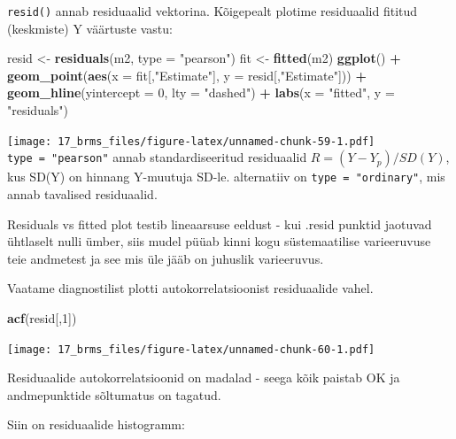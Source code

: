 \documentclass[]{book}
\newenvironment{Shaded}{\begin{snugshade}}{\end{snugshade}}
\newcommand{\KeywordTok}[1]{\textcolor[rgb]{0.13,0.29,0.53}{\textbf{#1}}}
\newcommand{\DataTypeTok}[1]{\textcolor[rgb]{0.13,0.29,0.53}{#1}}
\newcommand{\DecValTok}[1]{\textcolor[rgb]{0.00,0.00,0.81}{#1}}
\newcommand{\StringTok}[1]{\textcolor[rgb]{0.31,0.60,0.02}{#1}}
\newcommand{\OperatorTok}[1]{\textcolor[rgb]{0.81,0.36,0.00}{\textbf{#1}}}
\newcommand{\NormalTok}[1]{#1}
\begin{document}
\texttt{resid()} annab residuaalid vektorina. Kõigepealt plotime
residuaalid fititud (keskmiste) Y väärtuste vastu:

\begin{Shaded}
\begin{Highlighting}[]
\NormalTok{resid <-}\StringTok{ }\KeywordTok{residuals}\NormalTok{(m2, }\DataTypeTok{type =} \StringTok{"pearson"}\NormalTok{)}
\NormalTok{fit <-}\StringTok{ }\KeywordTok{fitted}\NormalTok{(m2)}
\KeywordTok{ggplot}\NormalTok{() }\OperatorTok{+}\StringTok{ }
\StringTok{  }\KeywordTok{geom_point}\NormalTok{(}\KeywordTok{aes}\NormalTok{(}\DataTypeTok{x =}\NormalTok{ fit[,}\StringTok{"Estimate"}\NormalTok{], }\DataTypeTok{y =}\NormalTok{ resid[,}\StringTok{"Estimate"}\NormalTok{])) }\OperatorTok{+}\StringTok{ }
\StringTok{  }\KeywordTok{geom_hline}\NormalTok{(}\DataTypeTok{yintercept =} \DecValTok{0}\NormalTok{, }\DataTypeTok{lty =} \StringTok{"dashed"}\NormalTok{) }\OperatorTok{+}
\StringTok{  }\KeywordTok{labs}\NormalTok{(}\DataTypeTok{x =} \StringTok{"fitted"}\NormalTok{, }\DataTypeTok{y =} \StringTok{"residuals"}\NormalTok{)}
\end{Highlighting}
\end{Shaded}

\texttt{[image: 17\_brms\_files/figure-latex/unnamed-chunk-59-1.pdf]}
\texttt{type\ =\ "pearson"} annab standardiseeritud residuaalid
\(R = (Y - Y_p) / SD(Y)\), kus SD(Y) on hinnang Y-muutuja SD-le.
alternatiiv on \texttt{type\ =\ "ordinary"}, mis annab tavalised
residuaalid.

Residuals vs fitted plot testib lineaarsuse eeldust - kui .resid punktid
jaotuvad ühtlaselt nulli ümber, siis mudel püüab kinni kogu
süstemaatilise varieeruvuse teie andmetest ja see mis üle jääb on
juhuslik varieeruvus.

Vaatame diagnostilist plotti autokorrelatsioonist residuaalide vahel.

\begin{Shaded}
\begin{Highlighting}[]
\KeywordTok{acf}\NormalTok{(resid[,}\DecValTok{1}\NormalTok{])}
\end{Highlighting}
\end{Shaded}

\texttt{[image: 17\_brms\_files/figure-latex/unnamed-chunk-60-1.pdf]}

Residuaalide autokorrelatsioonid on madalad - seega kõik paistab OK ja
andmepunktide sõltumatus on tagatud.

Siin on residuaalide histogramm:
\end{document}
